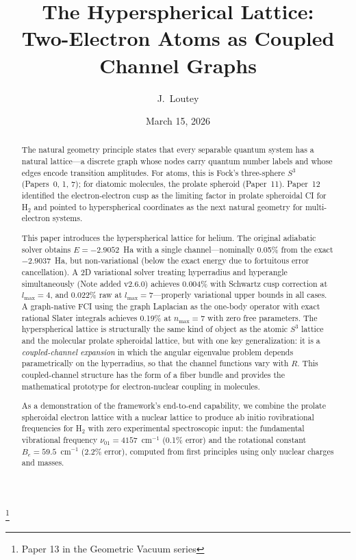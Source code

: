 \documentclass[aps,pra,twocolumn,superscriptaddress,longbibliography]{revtex4-2}
\begin{document}
\title{The Hyperspherical Lattice:\\
Two-Electron Atoms as Coupled Channel Graphs}
\thanks{Paper 13 in the Geometric Vacuum series}

\author{J.~Loutey}

\date{March 15, 2026}


\begin{abstract}
The natural geometry principle states that every separable quantum
system has a natural lattice---a discrete graph whose nodes carry
quantum number labels and whose edges encode transition amplitudes.
For atoms, this is Fock's three-sphere $S^3$ (Papers~0, 1, 7); for
diatomic molecules, the prolate spheroid (Paper~11).  Paper~12
identified the electron-electron cusp as the limiting factor in
prolate spheroidal CI for H$_2$ and pointed to hyperspherical
coordinates as the next natural geometry for multi-electron systems.

This paper introduces the hyperspherical lattice for helium.
The original adiabatic solver obtains $E = -2.9052$~Ha with a single
channel---nominally 0.05\% from the exact $-2.9037$~Ha, but
non-variational (below the exact energy due to fortuitous error
cancellation).  A 2D variational solver treating hyperradius and
hyperangle simultaneously (Note added v2.6.0) achieves 0.004\% with
Schwartz cusp correction at $l_{\max} = 4$, and 0.022\% raw at
$l_{\max} = 7$---properly variational upper bounds in all cases.
A graph-native FCI using the graph Laplacian as the one-body operator
with exact rational Slater integrals achieves 0.19\% at $n_{\max} = 7$
with zero free parameters.  The hyperspherical lattice is structurally
the same kind of object as the atomic $S^3$ lattice and the molecular
prolate spheroidal lattice, but with one key generalization: it is a
\emph{coupled-channel expansion} in which the angular eigenvalue
problem depends parametrically on the hyperradius, so that the channel
functions vary with $R$.  This coupled-channel structure has the form
of a fiber bundle and provides the mathematical prototype for
electron-nuclear coupling in molecules.

As a demonstration of the framework's end-to-end capability, we
combine the prolate spheroidal electron lattice with a nuclear
lattice to produce ab initio rovibrational frequencies for H$_2$
with zero experimental spectroscopic input: the fundamental
vibrational frequency $\nu_{01} = 4157$~cm$^{-1}$ (0.1\% error)
and the rotational constant $B_e = 59.5$~cm$^{-1}$ (2.2\% error),
computed from first principles using only nuclear charges and masses.
\end{abstract}
\end{document}
